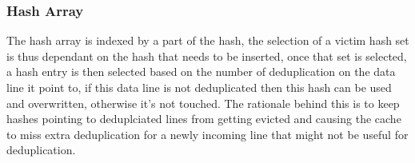 \subsubsection{Hash Array}
\label{sssec:DedupBDIHash}
The hash array is indexed by a part of the hash, the selection of a victim hash set is thus dependant on the hash that needs to be inserted, once that set is selected, a hash entry is then selected based on the number of deduplication on the data line it point to, if this data line is not deduplicated then this hash can be used and overwritten, otherwise it's not touched. The rationale behind this is to keep hashes pointing to deduplciated lines from getting evicted and causing the cache to miss extra deduplication for a newly incoming line that might not be useful for deduplication.

